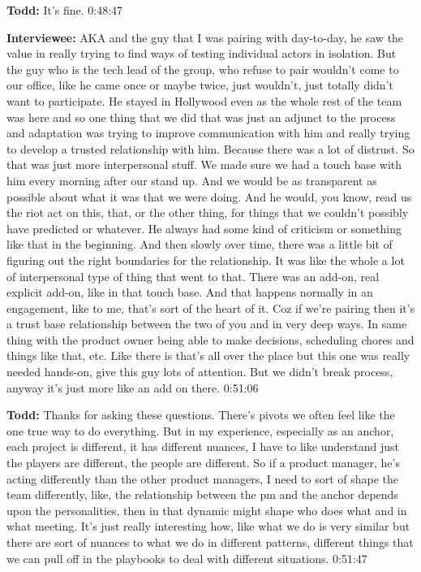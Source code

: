 \textbf{Todd:}  	It's fine.  0:48:47

\textbf{Interviewee:}  	AKA and the guy that I was pairing with day-to-day, he saw the value in really trying to find ways of testing individual actors in isolation.  But the guy who is the tech lead of the group, who refuse to pair wouldn't come to our office, like he came once or maybe twice, just wouldn't, just totally didn't want to participate. He stayed in Hollywood even as the whole rest of the team was here and so one thing that we did that was just an adjunct to the process and adaptation was trying to improve communication with him and really trying to develop a trusted relationship with him. Because there was a lot of distrust.   So that was just more interpersonal stuff. We made sure we had a touch base with him every morning after our stand up.  And we would be as transparent as possible about what it was that we were doing.    And he would, you know, read us the riot act on this, that, or the other thing,  for things that we couldn't possibly have predicted or whatever.   He always had some kind of criticism or something like that in the beginning.  And then slowly over time, there was a little bit of figuring out the right boundaries for the relationship.  It was like the whole a lot of  interpersonal type of thing that went to that.  There was an add-on, real explicit add-on, like in that touch base.    And that happens normally in an engagement, like to me, that's sort of the heart of it.    Coz if we're pairing then it's a trust base relationship between the two of you and in very deep ways. In same thing with the product owner being able to make decisions, scheduling chores and things like that, etc.  Like there is that's all over the place but this one was really needed hands-on, give this guy lots of attention.  But we didn't break process, anyway it's just more like an add on there.  0:51:06

\textbf{Todd:}  Thanks for asking these questions. There's pivots we often feel like the one true way to do everything.  But in my experience, especially as an anchor, each project is different, it has different nuances,  I have to like understand just the players are different, the people are different.  So if a product manager, he's acting differently than the other product managers, I need to sort of shape the team differently, like, the relationship between the pm and the anchor depends upon the personalities, then in that dynamic might shape who does what and in what meeting.  It's just really interesting how, like what we do is very similar but there are sort of nuances to what we do in different patterns, different things that we can pull off in the playbooks to deal with different situations.  0:51:47

